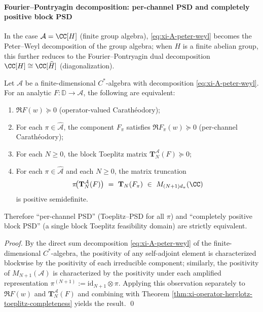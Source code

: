 \paragraph{Fourier--Pontryagin decomposition: per-channel PSD and completely positive block PSD}
In the case \(\mathcal{A}=\CC[H]\) (finite group algebra), \eqref{eq:xi-A-peter-weyl} becomes the Peter--Weyl decomposition of the group algebra;
when \(H\) is a finite abelian group, this further reduces to the Fourier--Pontryagin dual decomposition \(\CC[H]\cong \CC[\widehat H]\) (diagonalization).

\begin{theorem}\label{thm:xi-fourier-pontryagin-block-toeplitz}
Let \(\mathcal{A}\) be a finite-dimensional \(C^\ast\)-algebra with decomposition \eqref{eq:xi-A-peter-weyl}.
For an analytic \(F:\mathbb{D}\to\mathcal{A}\), the following are equivalent:
\begin{enumerate}
  \item \(\Re F(w)\succeq 0\) (operator-valued Carath\'eodory);
  \item For each \(\pi\in\widehat{\mathcal{A}}\), the component \(F_\pi\) satisfies \(\Re F_\pi(w)\succeq 0\) (per-channel Carath\'eodory);
  \item For each \(N\ge 0\), the block Toeplitz matrix \(\mathbf{T}^{\mathcal{A}}_N(F)\succeq 0\);
  \item For each \(\pi\in\widehat{\mathcal{A}}\) and each \(N\ge 0\), the matrix truncation
  \[
  \pi\!\bigl(\mathbf{T}^{\mathcal{A}}_N(F)\bigr)
  \ =\
  \mathbf{T}_N(F_\pi)\ \in\ M_{(N+1)d_\pi}(\CC)
  \]
  is positive semidefinite.
\end{enumerate}
Therefore ``per-channel PSD'' (Toeplitz--PSD for all \(\pi\)) and ``completely positive block PSD'' (a single block Toeplitz feasibility domain) are strictly equivalent.
\end{theorem}

\begin{proof}
By the direct sum decomposition \eqref{eq:xi-A-peter-weyl} of the finite-dimensional \(C^\ast\)-algebra, the positivity of any self-adjoint element is characterized blockwise by the positivity of each irreducible component;
similarly, the positivity of \(M_{N+1}(\mathcal{A})\) is characterized by the positivity under each amplified representation \(\pi^{(N+1)}:=\mathrm{id}_{N+1}\otimes \pi\).
Applying this observation separately to \(\Re F(w)\) and \(\mathbf{T}^{\mathcal{A}}_N(F)\) and combining with Theorem \ref{thm:xi-operator-herglotz-toeplitz-completeness} yields the result. \qed
\end{proof}

